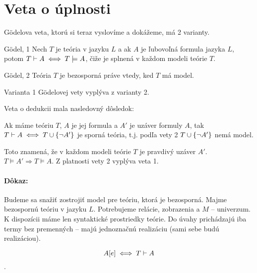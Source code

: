 \section{Veta o úplnosti}

G\"odelova veta, ktorú si teraz vyslovíme a dokážeme, má 2 varianty.

\begin{veta}{G\"odel, 1}
    Nech $T$ je teória v jazyku $L$ a ak $A$ je
    ľubovoľná formula jazyka $L$, potom $T \vdash A \iff T \models A$,
    čiže je splnená v každom modeli teórie $T$.
\end{veta}

\begin{veta}{G\"odel, 2}
    Teória $T$ je bezosporná práve vtedy, ked $T$ má model.
\end{veta}

\begin{poznamka}
    Varianta 1 G\"odelovej vety vyplýva z varianty 2.

    Veta o dedukcii mala nasledovný dôsledok:

    Ak máme teóriu $T$, $A$ je jej formula a $A'$ je uzáver formuly $A$,
    tak $T \vdash A \iff T \cup \{ \neg A' \}$ je sporná teória,
    t.j. podľa vety 2 $T \cup \{ \neg A' \}$ nemá model.

    Toto znamená, že v každom modeli teórie $T$ je pravdivý uzáver $A'$.
    $T \models A' \Rightarrow T \models A$. Z platnosti vety 2 vyplýva veta 1.
\end{poznamka}

\paragraph{Dôkaz:}

\par Budeme sa snažiť zostrojiť model pre teóriu, ktorá je bezosporná. Majme
bezospornú teóriu v jazyku $L$. Potrebujeme relácie, zobrazenia a $M$ --
univerzum. K dispozícii máme len syntaktické prostriedky teórie. Do úvahy
prichádzajú iba termy bez premenných -- majú jednoznačnú realizáciu (sami sebe
budú realizáciou).

$$A[e] \iff T \vdash A $$.

